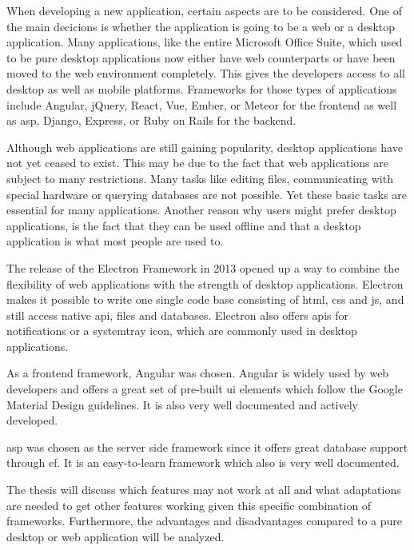 
When developing a new application, certain aspects are to be considered. One of the main decicions is whether the application is going to be a web or a desktop application. Many applications, like the entire Microsoft Office Suite, which used to be pure desktop applications now either have web counterparts or have been moved to the web environment completely. This gives the developers access to all desktop as well as mobile platforms. Frameworks for those types of applications include Angular, jQuery, React, Vue, Ember, or Meteor for the frontend as well as \gls{asp}, Django, Express, or Ruby on Rails for the backend.

Although web applications are still gaining popularity, desktop applications have not yet ceased to exist. This may be due to the fact that web applications are subject to many restrictions. Many tasks like editing files, communicating with special hardware or querying databases are not possible. Yet these basic tasks are essential for many applications. Another reason why users might prefer desktop applications, is the fact that they can be used offline and that a desktop application is what most people are used to.

The release of the Electron Framework in 2013 opened up a way to combine the flexibility of web applications with the strength of desktop applications. Electron makes it possible to write one single code base consisting of \gls{html}, \gls{css} and \gls{js}, and still access native \gls{api}, files and databases. Electron also offers \gls{api}s for notifications or a systemtray icon, which are commonly used in desktop applications.

As a frontend framework, Angular was chosen. Angular is widely used by web developers and offers a great set of pre-built \gls{ui} elements which follow the Google Material Design guidelines. It is also very well documented and actively developed.

\gls{asp} was chosen as the server side framework since it offers great database support through \gls{ef}. It is an easy-to-learn framework which also is very well documented.

The thesis will discuss which features may not work at all and what adaptations are needed to get other features working given this specific combination of frameworks. Furthermore, the advantages and disadvantages compared to a pure desktop or web application will be analyzed.



